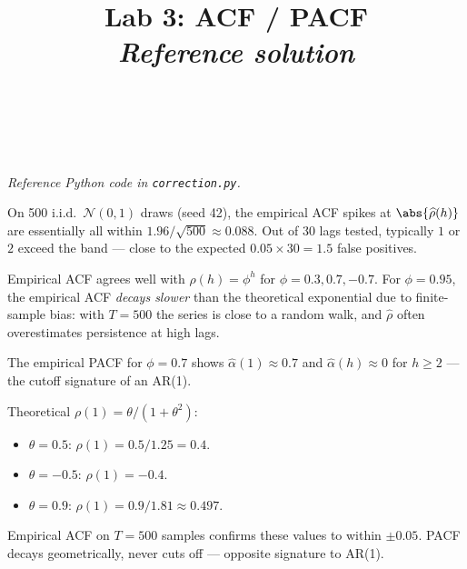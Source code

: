 \documentclass[a4paper,11pt]{article}
\title{Lab 3: ACF / PACF\\\large \emph{Reference solution}}
\author{\auteurNom\\\auteurEmail\\\auteurInstitution}
\date{\anneeUniversitaire}
\begin{document}
\maketitle

\noindent\emph{Reference Python code in \texttt{correction.py}.}

\setcounter{excounter}{0}
\begin{exercise}\end{exercise}

\begin{solution}
On 500 i.i.d.\ $\mathcal{N}(0, 1)$ draws (seed 42), the empirical ACF
spikes at $\abs{\widehat\rho(h)}$ are essentially all within
$1.96 / \sqrt{500} \approx 0.088$. Out of 30 lags tested,
typically $1$ or $2$ exceed the band — close to the expected
$0.05 \times 30 = 1.5$ false positives.
\end{solution}

\begin{exercise}[AR(1) simulation]\end{exercise}

\begin{solution}
Empirical ACF agrees well with $\rho(h) = \phi^h$ for $\phi = 0.3, 0.7,
-0.7$. For $\phi = 0.95$, the empirical ACF \emph{decays slower} than
the theoretical exponential due to finite-sample bias: with $T = 500$
the series is close to a random walk, and $\widehat\rho$ often
overestimates persistence at high lags.

The empirical PACF for $\phi = 0.7$ shows $\widehat\alpha(1) \approx 0.7$
and $\widehat\alpha(h) \approx 0$ for $h \geq 2$ — the cutoff signature
of an AR(1).
\end{solution}

\begin{exercise}[MA(1) simulation]\end{exercise}

\begin{solution}
Theoretical $\rho(1) = \theta / (1 + \theta^2)$:
\begin{itemize}
  \item $\theta = 0.5$: $\rho(1) = 0.5 / 1.25 = 0.4$.
  \item $\theta = -0.5$: $\rho(1) = -0.4$.
  \item $\theta = 0.9$: $\rho(1) = 0.9 / 1.81 \approx 0.497$.
\end{itemize}
Empirical ACF on $T = 500$ samples confirms these values to within
$\pm 0.05$. PACF decays geometrically, never cuts off — opposite
signature to AR(1).
\end{solution}
\end{document}

